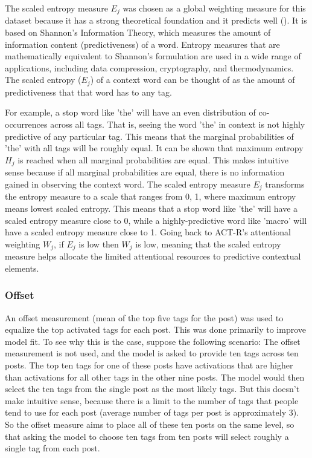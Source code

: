 \documentclass[10pt,letterpaper]{article}
\begin{document}
The scaled entropy measure $E_{j}$ was chosen as a global weighting measure for this dataset because it has a strong theoretical foundation and it predicts well ().
It is based on Shannon's Information Theory, which measures the amount of information content (predictiveness) of a word.
Entropy measures that are mathematically equivalent to Shannon's formulation are used in a wide range of applications, including data compression, cryptography, and thermodynamics.
The scaled entropy ($E_{j}$) of a context word can be thought of as the amount of predictiveness that that word has to any tag.

For example, a stop word like 'the' will have an even distribution of co-occurrences across all tags.
That is, seeing the word 'the' in context is not highly predictive of any particular tag.
This means that the marginal probabilities of 'the' with all tags will be roughly equal.
It can be shown that maximum entropy $H_{j}$ is reached when all marginal probabilities are equal.
This makes intuitive sense because if all marginal probabilities are equal, there is no information gained in observing the context word.
The scaled entropy measure $E_{j}$ transforms the entropy measure to a scale that ranges from 0, 1, where maximum entropy means lowest scaled entropy.
This means that a stop word like 'the' will have a scaled entropy measure close to 0, while a highly-predictive word like 'macro' will have a scaled entropy measure close to 1.
Going back to ACT-R's attentional weighting $W_{j}$, if $E_{j}$ is low then $W_{j}$ is low, meaning that the scaled entropy measure helps allocate the limited attentional resources to predictive contextual elements.

\subsubsection{Offset}

An offset measurement (mean of the top five tags for the post) was used to equalize the top activated tags for each post.
This was done primarily to improve model fit.
To see why this is the case, suppose the following scenario:
The offset measurement is not used, and the model is asked to provide ten tags across ten posts.
The top ten tags for one of these posts have activations that are higher than activations for all other tags in the other nine posts.
The model would then select the ten tags from the single post as the most likely tags.
But this doesn't make intuitive sense, because there is a limit to the number of tags that people tend to use for each post (average number of tags per post is approximately 3).
So the offset measure aims to place all of these ten posts on the same level, so that asking the model to choose ten tags from ten posts will select roughly a single tag from each post.
\end{document}
